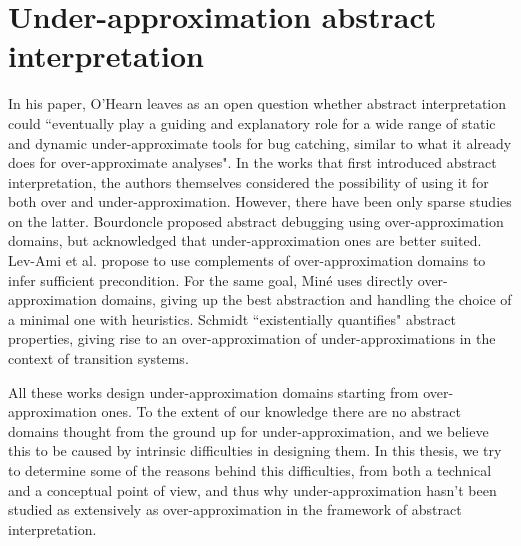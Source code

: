 \section{Under-approximation abstract interpretation}
In his paper, O'Hearn leaves as an open question whether abstract interpretation could ``eventually play a guiding and explanatory role for a wide range of static and dynamic under-approximate tools for bug catching, similar to what it already does for over-approximate analyses".
In the works that first introduced abstract interpretation, the authors themselves considered the possibility of using it for both over and under-approximation. However, there have been only sparse studies on the latter.
Bourdoncle \cite{bourdoncle-abs-debugging} proposed abstract debugging using over-approximation domains, but acknowledged that under-approximation ones are better suited.
Lev-Ami et al. \cite{lev-backward-analysis-complement} propose to use complements of over-approximation domains to infer sufficient precondition.
For the same goal, Miné \cite{mine-backward-underapprox-14} uses directly over-approximation domains, giving up the best abstraction and handling the choice of a minimal one with heuristics.
Schmidt \cite{schmidt-higher-order-approx-2007} ``existentially quantifies" abstract properties, giving rise to an over-approximation of under-approximations in the context of transition systems.

All these works design under-approximation domains starting from over-approximation ones. To the extent of our knowledge there are no abstract domains thought from the ground up for under-approximation, and we believe this to be caused by intrinsic difficulties in designing them. In this thesis, we try to determine some of the reasons behind this difficulties, from both a technical and a conceptual point of view, and thus why under-approximation hasn't been studied as extensively as over-approximation in the framework of abstract interpretation.

